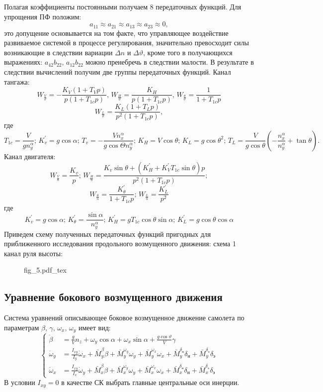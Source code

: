 \documentclass{article}
\begin{document}
Полагая коэффициенты постоянными получаем 8 передаточных функций. Для упрощения
ПФ положим:
\[
	a_{11} \approx a_{21} \approx a_{13} \approx a_{23} \approx 0,
\]
это допущение основывается на том факте, что управляющее воздействие
развиваемое системой в процессе регулирования, значительно превосходит силы
возникающие в следствии вариации $\Delta n$ и $\Delta \vartheta$, кроме того в
получающихся выражениях:
$a_{42} b_{22}, \, a_{12} b_{22}$ можно пренебречь в следствии малости.
В результате в следствии вычислений получим две группы передаточных функций.
Канал тангажа:
\[
	W_{\frac{V}{\vartheta}} = -\frac{K_V(1+T_Vp)}{p(1+T_{1c}p)}, \,
	W_{\frac{H}{\vartheta}} = \frac{K_H}{p(1+T_{1c}p)}, \,
	W_{\frac{\theta}{\vartheta}} = \frac{1}{1+T_{1c}p}
\]
\[
	W_{\frac{L}{\vartheta}} = \frac{K_L(1+T_Lp)}{p^2(1+T_{1c}p)},
\]
где
\[
	T_{1c} = \frac{V}{g n_y^\alpha}; \, K_v^{'} = g\cos{\alpha}; \, T_v =
	-\frac{V n_x^\alpha}{g \cos{\Theta} n_y^\alpha};\, K_H = V \cos{\theta}; \,
	K_L = g \cos{\theta}^2 ;\, T_L= \frac{V}{g \cos{\theta}} (-
	\frac{n_x^\alpha}{n_y^\alpha} + \tan{\theta}).
\]
Канал двигателя:
\[
	W_{\frac{V}{n}} = \frac{K_v}{p};\, W_{\frac{H}{n}} = \frac{K_v \sin{\theta}
	+ (K_H^{'} + K_V^{'} T_{1c} \sin{\theta})p}{p^2(1+T_{1c}p)};
\]
\[
	W_{\frac{\theta}{n}} = \frac{K_\theta^{'}}{1+T_{1c}p}; \, W_{\frac{L}{n}} =
	\frac{K_L^{'}}{p^2}
\]
где
\[
	K_v^{'} = g\cos{\alpha}; \, K_\theta^{'} = \frac{\sin{\alpha}}{n_y^\alpha};
	\, K_H^{'} = gT_{1c} \cos{\theta}\sin{\alpha};\, K_L^{'} = g\cos{\theta}
	\cos{\alpha}
\]
Приведем схему полученных передаточных функций пригодных для приближенного
исследования продольного возмущенного движения:
схема 1 канал руля высоты:
\begin{figure}[ht]
	{fig_5.pdf_tex}
\end{figure}

\subsection{Уравнение бокового возмущенного движения}
Система уравнений описывающее боковое возмущенное движение самолета по
параметрам $\beta, \, \gamma, \, \omega_x, \, \omega_y$ имеет вид:
\begin{equation}
	\begin{cases}
		\dot{\beta}    & = \frac{g}{V} n_z + \omega_y \cos{\alpha} + \omega_x
		\sin{\alpha} + \frac{g\cos{\vartheta}}{V} \gamma
		\\
		\dot{\omega}_y & = \frac{I_{xy}}{I_y} \dot{\omega}_x + \bar{M}_y^\beta
		\beta + \bar{M}_y^{\omega_y} \omega_y + \bar{M}_y^{\omega_x} \omega_x +
		\bar{M}_y^{\delta_\text{н}} \delta_\text{н} +
		\bar{M}_y^{\delta_\text{э}} \delta_\text{э}                            \\
		\dot{\omega}_x & = \frac{I_{xy}}{I_x} \dot{\omega}_y + \bar{M}_x^\beta
		\beta + \bar{M}_x^{\omega_y} \omega_y + \bar{M}_x^{\omega_x} \omega_x +
		\bar{M}_x^{\delta_\text{н}} \delta_\text{н} +
		\bar{M}_x^{\delta_\text{э}} \delta_\text{э}
	\end{cases}
\end{equation}
В условии $I_{xy} = 0$ в качестве СК выбрать главные центральные оси инерции.
\end{document}
